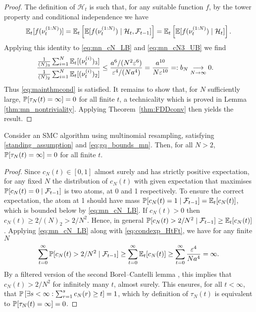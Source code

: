 \begin{proof}
The definition of $\mathcal{H}_t$ is such that, for any suitable function $f$, by the tower property and conditional independence we have
\begin{equation}
\mathbb{E}_t[ f(\nu_t^{(1:N)}) ] 
= \mathbb{E}_t\left[ \mathbb{E}[ f(\nu_t^{(1:N)}) \mid \mathcal{H}_t, \mathcal{F}_{t-1} ] \right] 
= \mathbb{E}_t\left[ \mathbb{E}[ f(\nu_t^{(1:N)}) \mid \mathcal{H}_t ] \right] .\label{eq:condexp_HtFt}
\end{equation}
Applying this identity to \eqref{eq:mn_cN_LB} and \eqref{eq:mn_cN3_UB} we find
\begin{align*}
\frac{\frac{1}{(N)_3} \sum_{i=1}^N \mathbb{E}_t[ (\nu_t^{(i)})_3 ]}{\frac{1}{(N)_2} \sum_{i=1}^N \mathbb{E}_t[ (\nu_t^{(i)})_2 ]}
&\leq \frac{ a^6 / (N^2 \varepsilon^6) }{ \varepsilon^4 / (N a^4) }
= \frac{ a^{10} }{ N\varepsilon^{10} }
=: b_N \underset{N\to\infty}{\longrightarrow} 0.
\end{align*}
Thus \eqref{eq:mainthmcond} is satisfied. 
It remains to show that, for $N$ sufficiently large, $\mathbb{P}[ \tau_N(t) = \infty ] =0$ for all finite $t$, a technicality which is proved in Lemma \ref{thm:mn_nontriviality}. 
Applying Theorem~\ref{thm:FDDconv} then yields the result.
\end{proof}



\begin{lemma}\label{thm:mn_nontriviality}
Consider an SMC algorithm using multinomial resampling, satisfying \ref{standing_assumption} and \eqref{eq:gq_bounds_mn}. 
Then, for all $N>2$, $\mathbb{P}[ \tau_N(t) = \infty ]=0$ for all finite $t$.
\end{lemma}

\begin{proof}
Since $c_N(t) \in [0,1]$ almost surely and has strictly positive expectation, for any fixed $N$ the distribution of $c_N(t)$ with given expectation that maximises $\mathbb{P}[ c_N(t)=0 \mid \mathcal{F}_{t-1} ]$ is two atoms, at 0 and 1 respectively. To ensure the correct expectation, the atom at 1 should have mass $\mathbb{P}[ c_N(t)=1 \mid \mathcal{F}_{t-1} ] = \mathbb{E}_t [ c_N(t) ]$, which is bounded below by \eqref{eq:mn_cN_LB}.
If $c_N(t) > 0$ then $c_N(t) \geq 2/(N)_2 > 2/N^2$. Hence, in general $\mathbb{P}[ c_N(t) > 2/N^2 \mid \mathcal{F}_{t-1} ] \geq \mathbb{E}_t [c_N(t)]$. Applying \eqref{eq:mn_cN_LB} along with \eqref{eq:condexp_HtFt}, we have for any finite $N$
\begin{equation*}
\sum_{t=0}^\infty \mathbb{P}[ c_N(t) > 2/N^2 \mid \mathcal{F}_{t-1} ]
\geq \sum_{t=0}^\infty \mathbb{E}_t [ c_N(t) ]
\geq \sum_{t=0}^\infty \frac{\varepsilon^4}{Na^4}
= \infty .
\end{equation*}
By a filtered version of the second Borel--Cantelli lemma \parencite[see for example][Theorem 4.3.4]{durrett2019}, this implies that $c_N(t) >2/N^2$ for infinitely many $t$, almost surely.
This ensures, for all $t <\infty$, that $\mathbb{P}\left[ \exists s<\infty : \sum_{r=1}^s c_N(r) \geq t \right] =1$, which by definition of $\tau_N(t)$ is equivalent to $\mathbb{P}[ \tau_N(t) = \infty ] =0$.
\end{proof}




